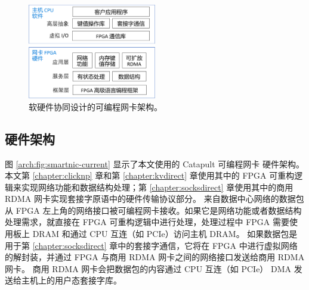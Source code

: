 \begin{figure}[htbp]
	\centering
	\includegraphics[width=0.5\textwidth]{figures/sw_hw_codesign.pdf}
	\caption{软硬件协同设计的可编程网卡架构。}
	\label{arch:fig:sw-hw-codesign}
\end{figure}


\subsection{硬件架构}


图 \ref{arch:fig:smartnic-current} 显示了本文使用的 Catapult 可编程网卡 \cite{putnam2014reconfigurable} 硬件架构。
本文第 \ref{chapter:clicknp} 章和第 \ref{chapter:kvdirect} 章使用其中的 FPGA 可重构逻辑来实现网络功能和数据结构处理；第 \ref{chapter:socksdirect} 章使用其中的商用 RDMA 网卡实现套接字原语中的硬件传输协议部分。
来自数据中心网络的数据包从 FPGA 左上角的网络接口被可编程网卡接收。如果它是网络功能或者数据结构处理需求，就直接在 FPGA 可重构逻辑中进行处理，处理过程中 FPGA 需要使用板上 DRAM 和通过 CPU 互连（如 PCIe）访问主机 DRAM。
如果数据包是用于第 \ref{chapter:socksdirect} 章中的套接字通信，它将在 FPGA 中进行虚拟网络的解封装，并通过 FPGA 与商用 RDMA 网卡之间的网络接口发送给商用 RDMA 网卡。
商用 RDMA 网卡会把数据包的内容通过 CPU 互连（如 PCIe） DMA 发送给主机上的用户态套接字库。


